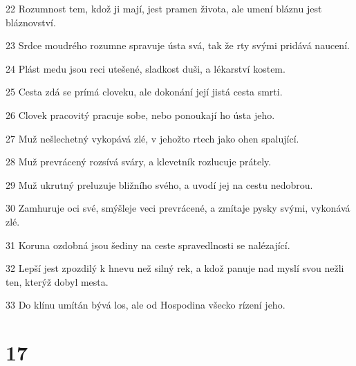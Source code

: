 \par 22 Rozumnost tem, kdož ji mají, jest pramen života, ale umení bláznu jest bláznovství.
\par 23 Srdce moudrého rozumne spravuje ústa svá, tak že rty svými pridává naucení.
\par 24 Plást medu jsou reci utešené, sladkost duši, a lékarství kostem.
\par 25 Cesta zdá se prímá cloveku, ale dokonání její jistá cesta smrti.
\par 26 Clovek pracovitý pracuje sobe, nebo ponoukají ho ústa jeho.
\par 27 Muž nešlechetný vykopává zlé, v jehožto rtech jako ohen spalující.
\par 28 Muž prevrácený rozsívá sváry, a klevetník rozlucuje prátely.
\par 29 Muž ukrutný preluzuje bližního svého, a uvodí jej na cestu nedobrou.
\par 30 Zamhuruje oci své, smýšleje veci prevrácené, a zmítaje pysky svými, vykonává zlé.
\par 31 Koruna ozdobná jsou šediny na ceste spravedlnosti se nalézající.
\par 32 Lepší jest zpozdilý k hnevu než silný rek, a kdož panuje nad myslí svou nežli ten, kterýž dobyl mesta.
\par 33 Do klínu umítán bývá los, ale od Hospodina všecko rízení jeho.

\chapter{17}

